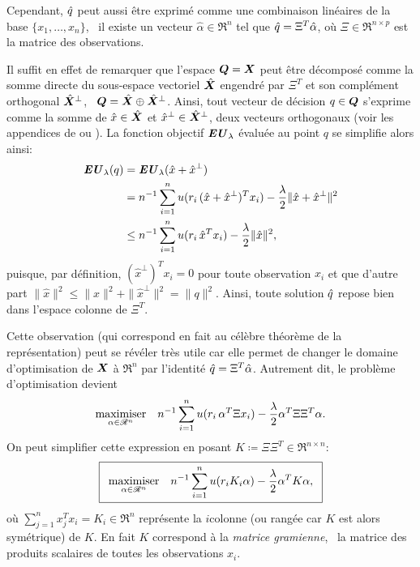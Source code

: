 Cependant, $\qh$ peut aussi être exprimé comme une combinaison linéaires de la base
$\{x_1,\ldots,x_n\}$, \ie\ il existe un vecteur $\hat\alpha \in \Re^n$ tel que
$\qh = \Xi^T\hat\alpha$, où $\Xi \in \Re^{n \times p}$ est la matrice des observations.

Il suffit en effet de remarquer que l'espace $\Q = \X$ peut être décomposé comme la somme
directe du sous-espace vectoriel $\hat\X$ engendré par $\Xi^T$ et son complément orthogonal
$\hat\X^\perp$, \ie\ $\Q = \hat\X \oplus \hat\X^\perp$. Ainsi, tout vecteur de décision
$q \in \Q$ s'exprime comme la somme de $\hat x\in\hat\X$ et
$\hat x^\perp \in \hat\X^\perp$, deux vecteurs orthogonaux (voir les appendices de
\cite{boyd2004convex} ou \cite{mohri2012foundations}). La fonction objectif $\EU_\lambda$
évaluée au point $q$ se simplifie alors ainsi:
\begin{align}
  \EU_\lambda(q) &= \EU_\lambda(\hat x + \hat x^\perp)\\
           &= n^{-1}\sumi u(r_i\,(\hat x + \hat x^\perp)^Tx_i) - \frac{\lambda}{2}\|\hat x + \hat
             x^\perp\|^2\\
           &\leq n^{-1}\sumi u(r_i\,\hat x^Tx_i) - \frac{\lambda}{2}\|\hat x\|^2,
\end{align}
puisque, par définition, $(\hat x^\perp)^Tx_i = 0$ pour toute observation $x_i$ et que d'autre
part $\|\hat x\|^2 \leq \|\hat x\|^2+\|\hat x^\perp\|^2 = \|q\|^2$. Ainsi, toute solution
$\qh$ repose bien dans l'espace colonne de $\Xi^T$.

Cette observation (qui correspond en fait au célèbre théorème de la représentation) peut
se révéler très utile car elle permet de changer le domaine d'optimisation de $\X$ à
$\Re^n$ par l'identité $\qh = \Xi^T\hat\alpha$. Autrement dit, le problème d'optimisation devient
\begin{equation}
  \maximizeEquation[\alpha \in \Re^n]{n^{-1}\sumi u(r_i\,\alpha^T\Xi x_i) - \frac{\lambda}{2}\alpha^T\Xi\Xi^T\alpha.}
\end{equation}
On peut simplifier cette expression en posant $K \coloneqq \Xi\Xi^T \in \Re^{n \times n}$:
{\begin{equation}
  \boxed{
  \maximizeEquation[\alpha \in \Re^n]{n^{-1}\sumi u(r_iK_i\alpha) - \frac{\lambda}{2}\alpha^TK\alpha,}}
\end{equation}
\vspace{-\baselineskip}}
où $\sum_{j=1}^nx_j^Tx_i = K_i \in \Re^n$ représente la $i$\ieme colonne (ou rangée car
$K$ est alors symétrique) de $K$. En fait $K$ correspond à la \textit{matrice gramienne},
\ie\ la matrice des produits scalaires de toutes les observations $x_i$.

